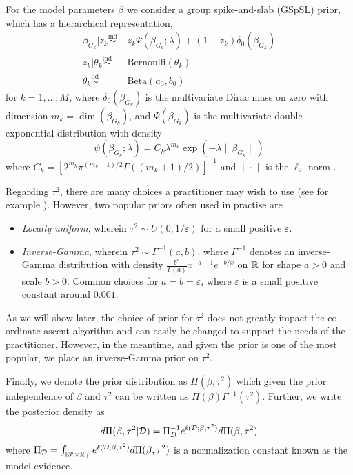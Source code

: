 For the model parameters $\beta$ we consider a group spike-and-slab (GSpSL) prior, which has a hierarchical representation,
\begin{equation}
\begin{aligned}
    \beta_{G_k} | z_k \overset{\text{ind}}{\sim} &\ z_k \Psi(\beta_{G_k}; \lambda) + (1-z_k) \delta_0(\beta_{G_k}) \\
    z_k | \theta_k \overset{\text{ind}}{\sim} &\ \text{Bernoulli}(\theta_k) \\
    \theta_k \overset{\text{iid}}{\sim} &\ \text{Beta}(a_0, b_0)
\end{aligned}
\end{equation}
for $k=1,\dots,M$, where $\delta_0(\beta_{G_k})$ is the multivariate Dirac mass on zero with dimension $m_k = \dim(\beta_{G_k})$, and $\Psi(\beta_{G_k})$ is the multivariate double exponential distribution with density
\begin{equation} \label{eq:density_mvde}
    \psi(\beta_{G_k}; \lambda) = C_k \lambda^{m_k} \exp \left( - \lambda \| \beta_{G_k} \| \right)
\end{equation}
where $ C_k = \left[ 2^{m_k} \pi^{(m_k -1)/2} \Gamma \left( (m_k + 1) /2 \right) \right]^{-1} $ and $ \| \cdot \| $ is the $\ell_2$-norm \citep{Bai2020d}.

Regarding $\tau^2$, there are many choices a practitioner may wish to use (see for example \citep{Gelman2006}). However, two popular priors often used in practise are
\begin{itemize}
    \itemsep0em
    \item \textit{Locally uniform}, wherein $\tau^2 \sim U(0, 1/\varepsilon)$ for a small positive $\varepsilon$.
    \item \textit{Inverse-Gamma}, wherein $\tau^2 \sim \Gamma^{-1}(a, b)$, where $\Gamma^{-1}$ denotes an inverse-Gamma distribution with density $\frac{b^a}{\Gamma(a)}x^{-a-1} e^{-b/x}$ on $\mathbb{R}$ for shape $a > 0$ and scale $b > 0$. Common choices for $a=b=\varepsilon$, where $\varepsilon$ is a small positive constant around $0.001$.
\end{itemize}
As we will show later, the choice of prior for $\tau^2$ does not greatly impact the co-ordinate ascent algorithm and can easily be changed to support the needs of the practitioner. However, in the meantime, and given the prior is one of the most popular, we place an inverse-Gamma prior on $\tau^2$.

Finally, we denote the prior distribution as $\Pi(\beta, \tau^2)$ which given the prior independence of $\beta$ and $\tau^2$ can be written as $\Pi(\beta) \Gamma^{-1}(\tau^2)$. Further, we write the posterior density as
\begin{equation} \label{eq:posterior} 
d\Pi(\beta, \tau^2 | \mathcal{D}) = \Pi_D^{-1} e^{\ell(\mathcal{D}; \beta, \tau^2)} d\Pi(\beta, \tau^2)
\end{equation}
where $\Pi_{\mathcal{D}} = \int_{\mathbb{R}^{p} \times \mathbb{R}_+} e^{\ell(\mathcal{D}; \beta, \tau^2)} d\Pi(\beta, \tau^2)$ is a normalization constant known as the model evidence.


